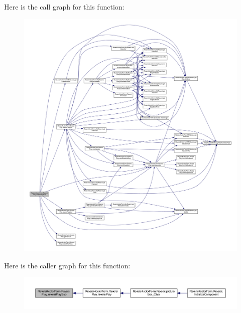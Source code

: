 Here is the call graph for this function\+:
\nopagebreak
\begin{figure}[H]
\begin{center}
\leavevmode
\includegraphics[width=350pt]{class_reversi4color_form_1_1_reversi_play_a92b619d3fb9e1fbbb36b6b60f6dee422_cgraph}
\end{center}
\end{figure}
Here is the caller graph for this function\+:
\nopagebreak
\begin{figure}[H]
\begin{center}
\leavevmode
\includegraphics[width=350pt]{class_reversi4color_form_1_1_reversi_play_a92b619d3fb9e1fbbb36b6b60f6dee422_icgraph}
\end{center}
\end{figure}
\mbox{\label{class_reversi4color_form_1_1_reversi_play_a99633b55c8a3beff94a2726927fcef09}} 
